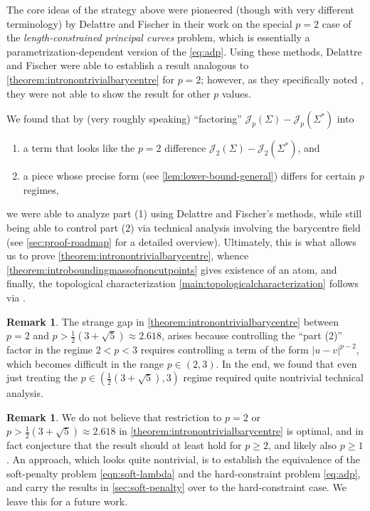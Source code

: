 \documentclass[preprint, reqno]{amsart}
\theoremstyle{definition}
\newtheorem{remark}[definition]{Remark}
\numberwithin{equation}{section}
\begin{document}
The core ideas of the strategy above were pioneered (though with very
different terminology) by Delattre and Fischer in their work on the
special $p=2$ case of the \emph{length-constrained principal curves}
problem, which is essentially a parametrization-dependent version of
the \eqref{eq:adp}. Using these methods, Delattre and Fischer were
able to establish a result \cite[Lemma\ 3.2]{Delattre17} analogous to
\cref{theorem:intronontrivialbarycentre} for $p =2$; however, as they
specifically noted \cite[\S 1.3]{Delattre17}, they were not able to
show the result for other $p$ values.

We found that by (very roughly speaking) ``factoring'' $\mathscr
J_p(\Sigma) - \mathscr J_p(\Sigma^*)$ into
\begin{enumerate}
  \item a term that looks like the $p=2$ difference $\mathscr
    J_2(\Sigma) - \mathscr J_2(\Sigma^*)$, and
  \item a piece whose precise form (see
    \cref{lem:lower-bound-general}) differs for certain $p$ regimes,
\end{enumerate}
we were able to analyze part (1) using Delattre and Fischer's methods,
while still being able to control part (2) via technical analysis
involving the barycentre field (see \cref{sec:proof-roadmap} for a
detailed overview). Ultimately, this is what allows us to prove
\cref{theorem:intronontrivialbarycentre}, whence
\cref{theorem:introboundingmassofnoncutpoints} gives existence of an
atom, and finally, the topological characterization
\cref{main:topologicalcharacterization} follows via \cite[Theorem\
5.5]{Stepanov06}.


\begin{remark}\label{rmk:strangegap}
  The strange gap in \cref{theorem:intronontrivialbarycentre} between
  $p = 2$ and $p > \frac{1}{2}(3 + \sqrt 5)\approx 2.618 $, arises
  because controlling the ``part (2)'' factor in the regime $2 < p <
  3$ requires controlling a term of the form $\lvert u - v
  \rvert^{p-2}$, which becomes difficult in the range $p \in (2, 3)$.
  In the end, we found that even just treating the $p \in
  (\frac{1}{2}(3 + \sqrt 5), 3)$ regime required quite nontrivial
  technical analysis.
\end{remark}

\begin{remark}\label{rmk:extension-general}
  We do not believe that restriction to $p = 2$ or $p > \frac{1}{2}(3
  + \sqrt{5}) \approx 2.618$ in
  \cref{theorem:intronontrivialbarycentre} is optimal, and in fact
  conjecture that the result should at least hold for $p \geq 2$, and
  likely also $p \geq 1$. An approach, which looks quite nontrivial,
  is to establish the equivalence of the soft-penalty problem
  \eqref{eqn:soft-lambda} and the hard-constraint problem
  \eqref{eq:adp}, and carry the results in \cref{sec:soft-penalty}
  over to the hard-constraint case. We leave this for a future work.
\end{remark}
\end{document}
